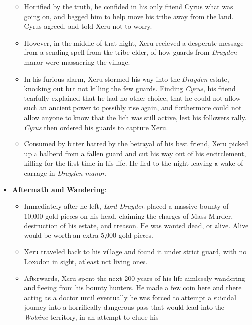 \documentclass[12pt]{article}
\begin{document}
\begin{itemize}
      \begin{itemize}
        \item Horrified by the truth, he confided in his only friend Cyrus what
          was going on, and begged him to help move his tribe away from the
          land. Cyrus agreed, and told Xeru not to worry.
        \item However, in the middle of that night, Xeru recieved a desperate
          message from a sending spell from the tribe elder, of how guards from
          \textit{Drayden} manor were massacring the village.
        \item In his furious alarm, Xeru stormed his way into the
          \textit{Drayden} estate, knocking out but not killing the few guards.
          Finding \textit{Cyrus}, his friend tearfully explained that he had no
          other choice, that he could not allow such an ancient power to
          possibly rise again, and furthermore could not allow anyone to know
          that the lich was still active, lest his followers rally.
          \textit{Cyrus} then ordered his guards to capture Xeru.
        \item Consumed by bitter hatred by the betrayal of his best friend, Xeru
          picked up a halberd from a fallen guard and cut his way out of his
          encirclement, killing for the first time in his life. He fled to the
          night leaving a wake of carnage in \textit{Drayden manor}.
      \end{itemize}
    \item \textbf{Aftermath and Wandering}:
      \begin{itemize}
        \item Immediately after he left, \textit{Lord Drayden} placed a massive
          bounty of 10,000 gold pieces on his head, claiming the charges of Mass
          Murder, destruction of his estate, and treason. He was wanted dead, or
          alive. Alive would be worth an extra 5,000 gold pieces.
        \item Xeru traveled back to his village and found it under strict guard,
          with no Loxodon in sight, atleast not living ones.
        \item Afterwards, Xeru spent the next 200 years of his life aimlessly
          wandering and fleeing from his bounty hunters. He made a few coin here
          and there acting as a doctor until eventually he was forced to attempt
          a suicidal journey into a horrifically dangerous pass that would lead
          into the \textit{Wolvine} territory, in an attempt to elude his

\end{itemize}
\end{itemize}
\end{document}
